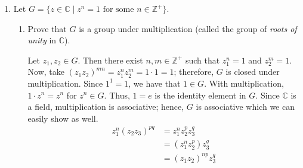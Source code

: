 \begin{enumerate}
\begin{align*}
                      & = x + y + z - [y + z] - [x + y + z] + [y + z]\eqnumtag
                        \label{ch1prob8}\\
                      & = x + y + z - [x + y + z]\\
                      & = x + y + z - [x + y] - [x + y + z] + [x + y]\\
                      & = x + y + z - [x + y] - [x + y + z - [x + y]]\\
                      &=  (x + y - [x + y]) + z - [(x + y - [x + y]) + z]\\
                      & = (x\star y) + z - [(x\star y) + z]\\
                      & = (x\star y)\star z
  \end{align*}
   occurs since if \(x\in\mathbb{R}\) and \(n\in\mathbb{Z}^+\),
  then \([x + n] = [x] + n\).
  Therefore, \(\star\) is associative.
  \begin{align*}
    x\star y & = x + y - [x + y]\\
             & = y + x - [y + x]\\
             & = y\star x
  \end{align*}
  Therefore, \(\star\) is commutative and \(G\) is an abelian group.
\item
  Let
  \(G = \{z\in\mathbb{C}\mid z^n = 1\text{ for some } n\in\mathbb{Z}^+\}\).
  \begin{enumerate}[label = (\alph*)]
  \item
    Prove that \(G\) is a group under multiplication (called the group of
    \textit{roots of unity} in \(\mathbb{C}\)).
    \par\smallskip
    Let \(z_1, z_2\in G\).
    Then there exist \(n, m\in\mathbb{Z}^+\) such that \(z_1^n = 1\) and
    \(z_2^m = 1\).
    Now, take \((z_1z_2)^{mn} = z_1^nz_2^m = 1\cdot 1 = 1\); therefore, \(G\)
    is closed under multiplication.
    Since \(1^1 = 1\), we have that \(1\in G\).
    With multiplication, \(1\cdot z^n = z^n\) for \(z^n\in G\).
    Thus, \(1 = e\) is the identity element in \(G\).
    Since \(\mathbb{C}\) is a field, multiplication is associative; hence,
    \(G\) is associative which we can easily show as well.
    \begin{align*}
      z_1^n(z_2z_3)^{pq} & = z_1^nz_2^pz_3^q\\
                         & = (z_1^nz_2^p)z_3^q\\
                         & = (z_1z_2)^{np}z_3^q
    \end{align*}

\end{enumerate}
\end{enumerate}
